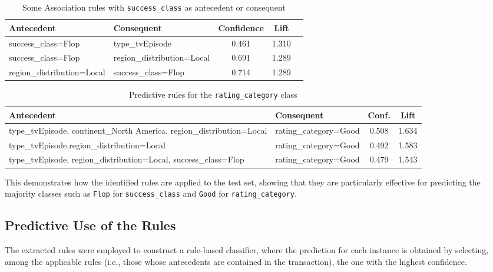\documentclass[10pt]{article}
\begin{document}
\begin{table}[htbp]
\centering
\caption{Some Association rules with \texttt{success\_class} as antecedent or consequent}
\label{tab:flop_rules}
\begin{tabular}{|p{5cm}|p{4.5cm}|c|c|c|}
\hline
\textbf{Antecedent} & \textbf{Consequent} & \textbf{Confidence} & \textbf{Lift} \\
\hline
success\_class=Flop & type\_tvEpisode & 0.461 & 1.310  \\
\hline
success\_class=Flop & region\_distribution=Local & 0.691 & 1.289 \\
\hline
region\_distribution=Local & success\_class=Flop & 0.714 & 1.289  \\

\hline
\end{tabular}
\end{table}

\begin{table}[htbp]
\centering
\caption{Predictive rules for the \texttt{rating\_category} class}
\label{tab:rating_good_rules}
\begin{tabular}{|p{6.5cm}|p{3.5cm}|c|c|}
\hline
\textbf{Antecedent} & \textbf{Consequent} & \textbf{Conf.} & \textbf{Lift} \\
\hline
type\_tvEpisode, continent\_North America, region\_distribution=Local & rating\_category=Good & 0.508 & 1.634 \\
\hline

type\_tvEpisode,\newline region\_distribution=Local & rating\_category=Good & 0.492 & 1.583 \\

\hline
type\_tvEpisode, \newline region\_distribution=Local, \newline success\_class=Flop & rating\_category=Good & 0.479 & 1.543 \\
\hline
\end{tabular}
\end{table}

This demonstrates how the identified rules are applied to the test set, showing that they are particularly effective for predicting the majority classes such as \texttt{Flop} for \texttt{success\_class} and \texttt{Good} for \texttt{rating\_category}.


\subsection{Predictive Use of the Rules}
The extracted rules were employed to construct a rule-based classifier, where the prediction for each instance is obtained by selecting, among the applicable rules (i.e., those whose antecedents are contained in the transaction), the one with the highest confidence.
\end{document}
